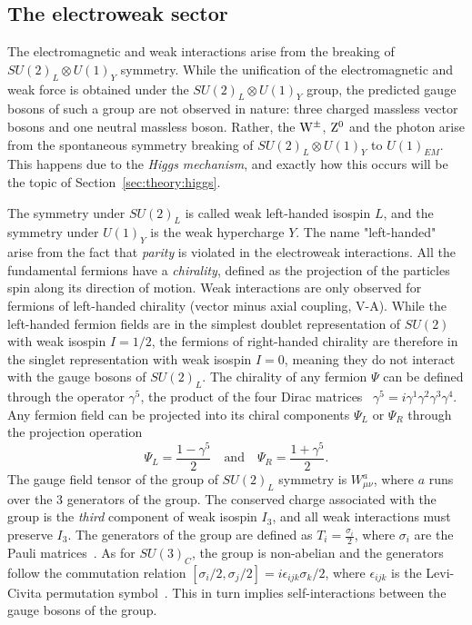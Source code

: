 \subsection{The electroweak sector}
\label{sec:theory:ew}
The electromagnetic and weak interactions arise from the breaking of $SU (2)_L \otimes U(1)_Y$ symmetry. While the unification of the electromagnetic and weak force is obtained under the $SU (2)_L \otimes U(1)_Y$ group, the predicted gauge bosons of such a group are not observed in nature: three charged massless vector bosons and one neutral massless boson. Rather, the $\mathrm{W}^{\pm}$, $\mathrm{Z}^{0}$ and the photon arise from the spontaneous symmetry breaking of $SU (2)_L \otimes U(1)_Y$ to $U(1)_{EM}$. This happens due to the \emph{Higgs mechanism}, and exactly how this occurs will be the topic of Section~\ref{sec:theory:higgs}.\par
The symmetry under $SU (2)_L$ is called weak left-handed isospin $L$, and the symmetry under $U(1)_Y$ is the weak hypercharge $Y$. The name "left-handed" arise from the fact that \emph{parity} is violated in the electroweak interactions. All the fundamental fermions have a \emph{chirality}, defined as the projection of the particles spin along its direction of motion. Weak interactions are only observed for fermions of left-handed chirality (vector minus axial coupling, V-A). While the left-handed fermion fields are in the simplest doublet representation of $SU(2)$ with weak isospin $I=1/2$, the fermions of right-handed chirality are therefore in the singlet representation with weak isospin $I=0$, meaning they do not interact with the gauge bosons of $SU (2)_L$. The chirality of any fermion $\Psi$ can be defined through the operator $\gamma^5$, the product of the four Dirac matrices~\cite{Pauli:1936gd} $\gamma^5=i\gamma^1\gamma^2\gamma^3\gamma^4$. Any fermion field can be projected into its chiral components $\Psi_L$ or $\Psi_R$ through the projection operation
\begin{equation}
  \Psi_L = \frac{1-\gamma^5}{2} \quad \textrm{and} \quad \Psi_R = \frac{1+\gamma^5}{2}.
  \end{equation}
The gauge field tensor of the group of $SU (2)_L$ symmetry is $W_{\mu\nu}^a$, where $a$ runs over the 3 generators of the group. The conserved charge associated with the group is the \emph{third} component of weak isospin $I_3$, and all weak interactions must preserve $I_3$. The generators of the group are defined as $T_i=\frac{\sigma_i}{2}$, where $\sigma_i$ are the Pauli matrices~\cite{inbook}. As for $SU (3)_C$, the group is non-abelian and the generators follow the commutation relation $[\sigma_i/2,\sigma_j/2]=i \epsilon_{ijk} \sigma_k/2$, where $\epsilon_{ijk}$ is the Levi-Civita permutation symbol~\cite{Duplij2004}. This in turn implies self-interactions between the gauge bosons of the group.\par
